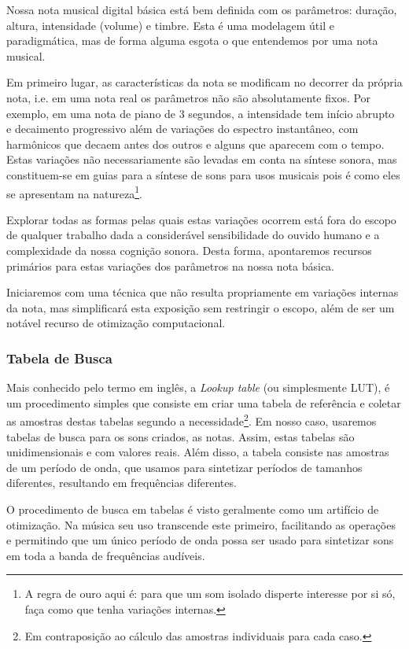 Nossa nota musical digital básica está bem definida com os parâmetros:
duração, altura, intensidade (volume) e timbre. Esta é uma modelagem
útil e paradigmática, mas de forma alguma esgota o que entendemos por
uma nota musical.

Em primeiro lugar, as características da nota se modificam no decorrer
da própria nota, i.e. em uma nota real os parâmetros
não são absolutamente fixos. Por exemplo, em uma nota de piano
de 3 segundos, a intensidade tem início abrupto e decaimento progressivo
além de variações do espectro instantâneo, com harmônicos que
decaem antes dos outros e alguns que aparecem com o tempo.
Estas variações não necessariamente são levadas
em conta na síntese sonora, mas constituem-se em guias para a
síntese de sons para usos musicais pois é como eles
se apresentam na natureza\footnote{A regra de ouro
aqui é: para que um som isolado disperte interesse
por si só, faça como que tenha variações internas.}. 

Explorar todas as formas pelas quais estas variações ocorrem está fora
do escopo de qualquer trabalho dada a considerável sensibilidade do ouvido humano
e a complexidade da nossa cognição sonora. Desta forma, apontaremos
recursos primários para estas variações dos parâmetros na nossa nota
básica.

Iniciaremos com uma técnica que não resulta propriamente
em variações internas da nota, mas simplificará esta exposição
sem restringir o escopo, além de ser um notável recurso de otimização
computacional.


\subsubsection{Tabela de Busca}


Mais conhecido pelo termo em inglês, a \emph{Lookup table} (ou simplesmente
LUT), é um procedimento simples que consiste em criar uma tabela
de referência e coletar as amostras destas tabelas segundo a 
necessidade\footnote{Em contraposição ao cálculo das amostras individuais
para cada caso.}. Em nosso caso, usaremos tabelas de busca para os
sons criados, as notas. Assim, estas tabelas são unidimensionais e com
valores reais. Além disso, a tabela consiste nas amostras
de um período de onda, que usamos para sintetizar períodos
de tamanhos diferentes, resultando em frequências diferentes.

O procedimento de busca em tabelas é visto geralmente como um
artifício de otimização. Na música seu uso transcende este
primeiro, facilitando as operações e permitindo que um único
período de onda possa ser usado para sintetizar sons em toda a banda
de frequências audíveis.

